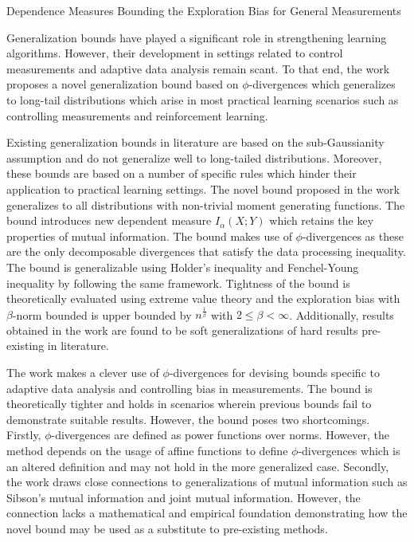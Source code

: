 \documentclass[12pt,letterpaper]{article}
\begin{document}
\begin{center}
  \large{Dependence Measures Bounding the Exploration
  Bias for General Measurements}
\end{center}

Generalization bounds have played a significant role in strengthening learning algorithms. However, their development in settings related to control measurements and adaptive data analysis remain scant. To that end, the work proposes a novel generalization bound based on $\phi$-divergences which generalizes to long-tail distributions which arise in most practical learning scenarios such as controlling measurements and reinforcement learning. 

Existing generalization bounds in literature are based on the sub-Gaussianity assumption and do not generalize well to long-tailed distributions. Moreover, these bounds are based on a number of specific rules which hinder their application to practical learning settings. The novel bound proposed in the work generalizes to all distributions with non-trivial moment generating functions. The bound introduces new dependent measure $I_{\alpha}(X;Y)$ which retains the key properties of mutual information. The bound makes use of $\phi$-divergences as these are the only decomposable divergences that satisfy the data processing inequality. The bound is generalizable using Holder's inequality and Fenchel-Young inequality by following the same framework. Tightness of the bound is theoretically evaluated using extreme value theory and the exploration bias with $\beta$-norm bounded is upper bounded by $n^{\frac{1}{\beta}}$ with $2 \leq\beta<\infty$. Additionally, results obtained in the work are found to be soft generalizations of hard results pre-existing in literature. 

The work makes a clever use of $\phi$-divergences for devising bounds specific to adaptive data analysis and controlling bias in measurements. The bound is theoretically tighter and holds in scenarios wherein previous bounds fail to demonstrate suitable results. However, the bound poses two shortcomings. Firstly, $\phi$-divergences are defined as power functions over norms. However, the method depends on the usage of affine functions to define $\phi$-divergences which is an altered definition and may not hold in the more generalized case. Secondly, the work draws close connections to generalizations of mutual information such as Sibson's mutual information and joint mutual information. However, the connection lacks a mathematical and empirical foundation demonstrating how the novel bound may be used as a substitute to pre-existing methods.
\end{document}
